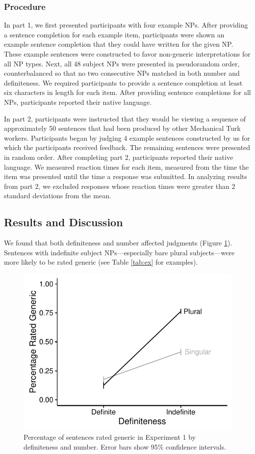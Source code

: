 \documentclass[10pt,letterpaper]{article}
\begin{document}
\subsubsection{Procedure}

In part 1, we first presented participants with four example NPs. After providing a sentence completion for each example item, participants were shown an example sentence completion that they could have written for the given NP. These example sentences were constructed to favor non-generic interpretations for all NP types. Next, all 48 subject NPs were presented in pseudorandom order, counterbalanced so that no two consecutive NPs matched in both number and definiteness. We required participants to provide a sentence completion at least six characters in length for each item. After providing sentence completions for all NPs, participants reported their native language.

In part 2, participants were instructed that they would be viewing a sequence of approximately 50 sentences that had been produced by other Mechanical Turk workers. Participants began by judging 4 example sentences constructed by us for which the participants received feedback. The remaining sentences were presented in random order. After completing part 2, participants reported their native language. We measured reaction times for each item, measured from the time the item was presented until the time a response was submitted.  In analyzing results from part 2, we excluded responses whose reaction times were greater than 2 standard deviations from the mean.

\subsection{Results and Discussion}

We found that both definiteness and number affected judgments (Figure \ref{fig:e2}). Sentences with indefinite subject NPs---especially bare plural subjects---were more likely to be rated generic (see Table \ref{tab:ex} for examples).

\begin{figure}[t]
\centering
\includegraphics[width=.8\linewidth]{figures/e2-2016.pdf}
\caption{\label{fig:e2} Percentage of sentences rated generic in Experiment 1 by definiteness and number. Error bars show 95\% confidence intervals.}
\end{figure}
\end{document}
